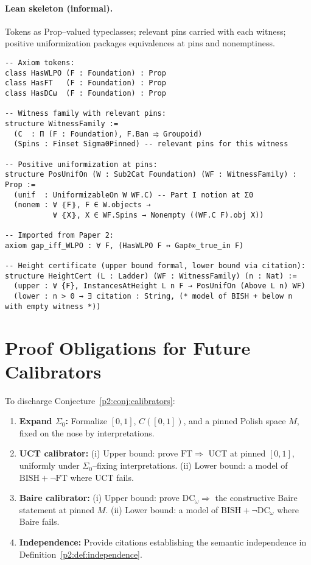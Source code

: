\documentclass[11pt]{article}
\theoremstyle{definition}
\theoremstyle{remark}
\newcommand{\BISH}{\mathrm{BISH}}
\newcommand{\SigmaZero}{\Sigma_{0}}
\begin{document}
\paragraph{Lean skeleton (informal).}
Tokens as Prop--valued typeclasses; relevant pins carried with each witness; positive uniformization packages equivalences at pins and nonemptiness.

\begin{verbatim}
-- Axiom tokens:
class HasWLPO (F : Foundation) : Prop
class HasFT   (F : Foundation) : Prop
class HasDCω  (F : Foundation) : Prop

-- Witness family with relevant pins:
structure WitnessFamily :=
  (C  : Π (F : Foundation), F.Ban ⥤ Groupoid)
  (Spins : Finset Sigma0Pinned) -- relevant pins for this witness

-- Positive uniformization at pins:
structure PosUnifOn (W : Sub2Cat Foundation) (WF : WitnessFamily) : Prop :=
  (unif  : UniformizableOn W WF.C) -- Part I notion at Σ0
  (nonem : ∀ ⦃F⦄, F ∈ W.objects →
           ∀ ⦃X⦄, X ∈ WF.Spins → Nonempty ((WF.C F).obj X))

-- Imported from Paper 2:
axiom gap_iff_WLPO : ∀ F, (HasWLPO F ↔ Gapℓ∞_true_in F)

-- Height certificate (upper bound formal, lower bound via citation):
structure HeightCert (L : Ladder) (WF : WitnessFamily) (n : Nat) :=
  (upper : ∀ {F}, InstancesAtHeight L n F → PosUnifOn (Above L n) WF)
  (lower : n > 0 → ∃ citation : String, (* model of BISH + below n with empty witness *))
\end{verbatim}

\section{Proof Obligations for Future Calibrators}\label{p2:sec:obligations}

To discharge Conjecture~\ref{p2:conj:calibrators}:
\begin{enumerate}
\item \textbf{Expand \(\SigmaZero\):} Formalize \([0,1]\), \(C([0,1])\), and a pinned Polish space \(M\), fixed on the nose by interpretations.
\item \textbf{UCT calibrator:} (i) Upper bound: prove \(\mathrm{FT}\Rightarrow\) UCT at pinned \([0,1]\), uniformly under \(\SigmaZero\)–fixing interpretations.
(ii) Lower bound: a model of \(\BISH+\neg\mathrm{FT}\) where UCT fails.
\item \textbf{Baire calibrator:} (i) Upper bound: prove \(\mathrm{DC}_\omega\Rightarrow\) the constructive Baire statement at pinned \(M\).
(ii) Lower bound: a model of \(\BISH+\neg\mathrm{DC}_\omega\) where Baire fails.
\item \textbf{Independence:} Provide citations establishing the semantic independence in Definition~\ref{p2:def:independence}.
\end{enumerate}
\end{document}
